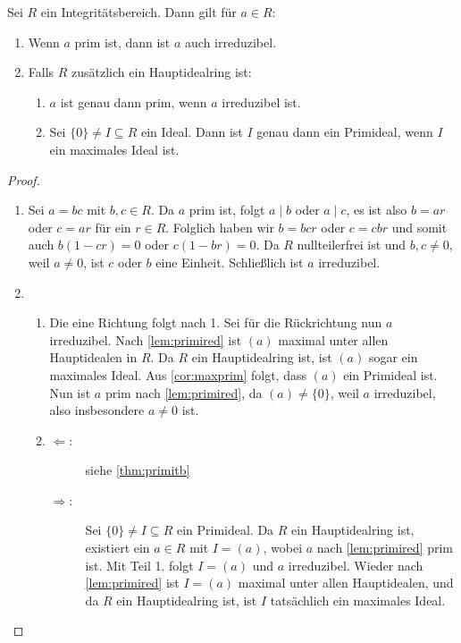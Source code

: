 \documentclass[12pt,a4paper]{scrartcl}
\begin{document}
\begin{satz} \label{thm:primirred_intb} Sei $R$ ein Integritätsbereich. Dann gilt für $a\in R$: \begin{enumerate}
		\item Wenn $a$ prim ist, dann ist $a$ auch irreduzibel.
		\item Falls $R$ zusätzlich ein Hauptidealring ist:
		\begin{enumerate}
			\item $a$ ist genau dann prim, wenn $a$ irreduzibel ist.
			\item Sei $\{0\}\neq I\subseteq R$ ein Ideal. Dann ist $I$ genau dann ein Primideal, wenn $I$ ein maximales Ideal ist.
		\end{enumerate}
	\end{enumerate}
\end{satz}
\begin{proof}
	\leavevmode
	\begin{enumerate}
		\item Sei $a = bc$ mit $b,c \in R$. Da $a$ prim ist, folgt $a\mid b$ oder $a \mid c$, es ist also $b = ar$ oder $c = ar$ für ein $r\in R$.  Folglich haben wir $b = bcr$ oder $c = cbr$ und somit auch $b(1-cr)=0$ oder $c(1-br)=0$. Da $R$ nullteilerfrei ist und $b,c \neq 0$, weil $a \neq 0$, ist $c$ oder $b$ eine Einheit. Schließlich ist $a$ irreduzibel.
		
		\item \begin{enumerate}
			\item Die eine Richtung folgt nach 1. Sei für die Rückrichtung nun $a$ irreduzibel. Nach \cref{lem:primired} ist $(a)$ maximal unter allen Hauptidealen in $R$. Da $R$ ein Hauptidealring ist, ist $(a)$ sogar ein maximales Ideal. Aus \cref{cor:maxprim} folgt, dass $(a)$ ein Primideal ist. Nun ist $a$ prim nach \cref{lem:primired}, da $(a)\neq\{0\}$, weil $a$ irreduzibel, also insbesondere $a\neq 0$ ist.
			
			\item \begin{description}
					\item[\glqq$\Leftarrow$\grqq:] siehe \cref{thm:primitb}
					\item[\glqq$\Rightarrow$\grqq:] Sei $\{0\}\neq I\subseteq R$ ein Primideal. Da $R$ ein Hauptidealring ist, existiert ein $a\in R$ mit $I = (a)$, wobei $a$ nach \cref{lem:primired} prim ist. Mit Teil 1. folgt $I = (a)$ und $a$ irreduzibel. Wieder nach \cref{lem:primired} ist $I = (a) $ maximal unter allen Hauptidealen, und da $R$ ein Hauptidealring ist, ist $I$ tatsächlich ein maximales Ideal.
					\end{description}
			\end{enumerate}
	\end{enumerate}
\end{proof}
\end{document}
